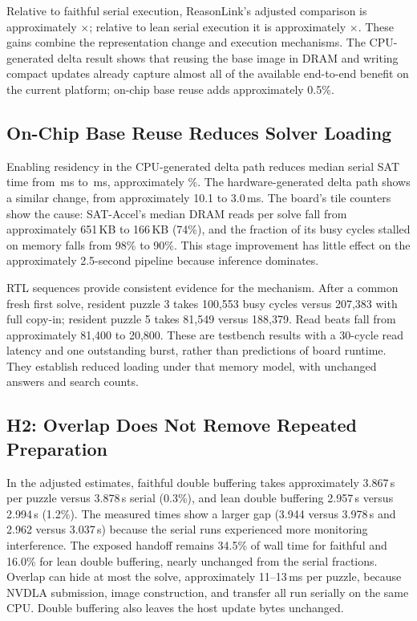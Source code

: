 Relative to faithful serial execution, ReasonLink's adjusted comparison is approximately \FaithfulRLSpeedup$\times$; relative to lean serial execution it is approximately \LeanRLSpeedup$\times$. These gains combine the representation change and execution mechanisms. The CPU-generated delta result shows that reusing the base image in DRAM and writing compact updates already capture almost all of the available end-to-end benefit on the current platform; on-chip base reuse adds approximately 0.5\%.

\subsection{On-Chip Base Reuse Reduces Solver Loading}
Enabling residency in the CPU-generated delta path reduces median serial SAT time from \DeltaSat\,ms to \DeltaResidentSat\,ms, approximately \ResidentReduction\%. The hardware-generated delta path shows a similar change, from approximately 10.1 to 3.0\,ms. The board's tile counters show the cause: SAT-Accel's median DRAM reads per solve fall from approximately 651\,KB to 166\,KB (74\%), and the fraction of its busy cycles stalled on memory falls from 98\% to 90\%. This stage improvement has little effect on the approximately 2.5-second pipeline because inference dominates.

RTL sequences provide consistent evidence for the mechanism. After a common fresh first solve, resident puzzle 3 takes 100,553 busy cycles versus 207,383 with full copy-in; resident puzzle 5 takes 81,549 versus 188,379. Read beats fall from approximately 81,400 to 20,800. These are testbench results with a 30-cycle read latency and one outstanding burst, rather than predictions of board runtime. They establish reduced loading under that memory model, with unchanged answers and search counts.

\subsection{H2: Overlap Does Not Remove Repeated Preparation}
In the adjusted estimates, faithful double buffering takes approximately 3.867\,s per puzzle versus 3.878\,s serial (0.3\%), and lean double buffering 2.957\,s versus 2.994\,s (1.2\%). The measured times show a larger gap (3.944 versus 3.978\,s and 2.962 versus 3.037\,s) because the serial runs experienced more monitoring interference. The exposed handoff remains 34.5\% of wall time for faithful and 16.0\% for lean double buffering, nearly unchanged from the serial fractions. Overlap can hide at most the solve, approximately 11--13\,ms per puzzle, because NVDLA submission, image construction, and transfer all run serially on the same CPU. Double buffering also leaves the host update bytes unchanged.

